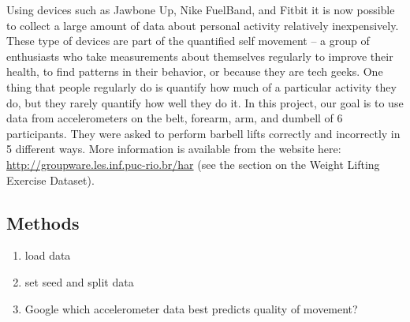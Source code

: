 \documentclass[]{tufte-handout}
\newenvironment{Shaded}{}{}
\newcommand{\AlertTok}[1]{\textcolor[rgb]{1.00,0.00,0.00}{\textbf{#1}}}
\newcommand{\CommentTok}[1]{\textcolor[rgb]{0.38,0.63,0.69}{\textit{#1}}}
\newcommand{\DataTypeTok}[1]{\textcolor[rgb]{0.56,0.13,0.00}{#1}}
\newcommand{\DecValTok}[1]{\textcolor[rgb]{0.25,0.63,0.44}{#1}}
\newcommand{\FloatTok}[1]{\textcolor[rgb]{0.25,0.63,0.44}{#1}}
\newcommand{\KeywordTok}[1]{\textcolor[rgb]{0.00,0.44,0.13}{\textbf{#1}}}
\newcommand{\NormalTok}[1]{#1}
\newcommand{\OperatorTok}[1]{\textcolor[rgb]{0.40,0.40,0.40}{#1}}
\newcommand{\OtherTok}[1]{\textcolor[rgb]{0.00,0.44,0.13}{#1}}
\newcommand{\StringTok}[1]{\textcolor[rgb]{0.25,0.44,0.63}{#1}}
\providecommand{\tightlist}{%
  \setlength{\itemsep}{0pt}\setlength{\parskip}{0pt}}
\begin{document}
Using devices such as Jawbone Up, Nike FuelBand, and Fitbit it is now
possible to collect a large amount of data about personal activity
relatively inexpensively. These type of devices are part of the
quantified self movement -- a group of enthusiasts who take measurements
about themselves regularly to improve their health, to find patterns in
their behavior, or because they are tech geeks. One thing that people
regularly do is quantify how much of a particular activity they do, but
they rarely quantify how well they do it. In this project, our goal is
to use data from accelerometers on the belt, forearm, arm, and dumbell
of 6 participants. They were asked to perform barbell lifts correctly
and incorrectly in 5 different ways. More information is available from
the website here: \url{http://groupware.les.inf.puc-rio.br/har} (see the
section on the Weight Lifting Exercise Dataset).

\hypertarget{methods}{%
\subsection{Methods}\label{methods}}

\begin{enumerate}
\def\labelenumi{\arabic{enumi}.}
\tightlist
\item
  load data
\item
  set seed and split data
\item
  Google which accelerometer data best predicts quality of movement?
\end{enumerate}

\begin{Shaded}
\end{Shaded}
\end{document}
